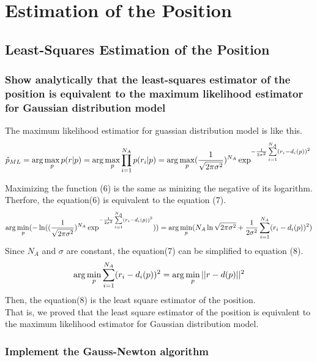 \documentclass[a4paper]{article}
\begin{document}
\section{Estimation of the Position}
\subsection{Least-Squares Estimation of the Position}
\subsubsection{Show analytically that the least-squares estimator of the position is equivalent to the maximum likelihood estimator for Gaussian distribution model}

\noindent
The maximum likelihood estimatior for guassian distribution model is like this.
\newcommand{\maxp}{\arg\max\limits_{p}}
\newcommand{\minp}{\arg\min\limits_{p}}
\begin{equation}
\hat{p}_{ML} = \arg\max\limits_{p}p(r|p) = \maxp\mulna\prip =\maxp (\frac{1}{\sqrt{2\pi\sigma^2}})^{N_A}\exp^{-\frac{1}{2\sigma^2}\signa(\ridi)^2} \\
\end{equation}

\noindent
Maximizing the function (6) is the same as minizing the negative of its logarithm. Therfore, the equation(6) is equivalent to the equation (7).
\begin{equation}
\minp(-\ln((\frac{1}{\sqrt{2\pi\sigma^2}})^{N_A}\exp^{-\frac{1}{2\sigma^2}\signa(\ridi)^2})) = \minp(N_A\ln\sqrt{2\pi\sigma^2}+\frac{1}{2\sigma^2}\signa(\ridi)^2)
\end{equation}
Since $N_A$ and $\sigma$ are constant, the equation(7) can be simplified to equation (8).
\begin{equation}
\minp\signa(\ridi)^2 = \minp ||r-d(p)||^2
\end{equation}
Then, the equation(8) is the least square estimator of the position.\\ That is, we proved that the least square estimator of the position is equivalent to the maximum likelihood estimator for Gaussian distribution model.

\subsubsection{Implement the Gauss-Newton algorithm}
\end{document}
